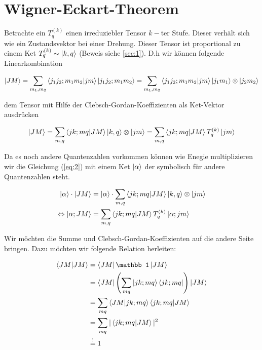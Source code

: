 
\usepackage{amsmath} 





\section*{Wigner-Eckart-Theorem}


Betrachte ein \(T^{(k)}_q\) einen irreduziebler Tensor \(k-\)ter Stufe. Dieser verhält sich wie ein Zustandsvektor bei einer Drehung. Dieser Tensor ist proportional zu einem Ket \(T^{(k)}_q \sim \left| k,q \right\rangle \) (Beweis siehe \ref{sec:1}). D.h wir können folgende Linearkombination

\begin{equation}
  \label{eq:1}
  \ket{JM} = \sum_{m_1,m_2}\braket{j_1j_2;m_1m_2}{jm}\ket{j_1j_2;m_1m_2} = \sum_{m_1,m_2}\braket{j_1j_2;m_1m_2}{jm}\ket{j_1m_1} \otimes \ket{j_2m_2}
\end{equation}

dem Tensor  mit Hilfe der Clebsch-Gordan-Koeffizienten als Ket-Vektor ausdrücken

\begin{equation}
  \label{eq:2}
  \ket{JM} = \sum_{m,q} \braket{jk;mq}{JM} \ket{k,q}\otimes\ket{jm} =  \sum_{m,q} \braket{jk;mq}{JM} T^{(k)}_q  \ket{jm} 
\end{equation}


Da es noch andere Quantenzahlen vorkommen können wie Enegie multiplizieren wir die Gleichung (\ref{eq:2}) mit einem Ket \(\left| \alpha \right\rangle\) der symbolisch für andere Quantenzahlen steht.

\begin{align}
  \label{eq:3}
  \ket{\alpha}\cdot\ket{JM} &=  \ket{\alpha}\cdot\sum_{m,q} \braket{jk;mq}{JM} \ket{k,q}\otimes\ket{jm} \\
\Leftrightarrow \ket{\alpha; JM} &=  \sum_{m,q} \braket{jk;mq}{JM} T^{(k)}_q  \ket{\alpha;jm} 
\end{align}

Wir möchten die Summe und  Clebsch-Gordan-Koeffizienten auf die andere Seite bringen. Dazu möchten wir folgende Relation herleiten:

\begin{align}
  \label{eq:4}
 \braket{JM}{JM} &= \bra{JM} \mathbb 1 \ket{JM} \\
&= \bra{JM} \left( \sum_{mq}\ket{jk;mq}\bra{jk;mq}  \right) \ket{JM} \\
&=  \sum_{mq}\braket{JM}{jk;mq}\braket{jk;mq}{JM} \\
&=  \sum_{mq}|\braket{jk;mq}{JM} |^2\\
&\stackrel{!}= 1
\end{align}

